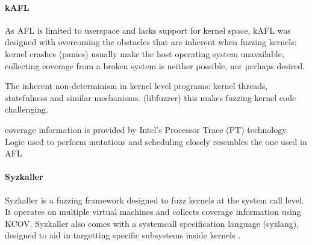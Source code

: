 \paragraph{kAFL}


As AFL is limited to userspace and lacks support for kernel space\cite{kafl}, kAFL was designed with overcoming 
the obstacles that are inherent when fuzzing kernels: kernel crashes (panics) usually make the host operating system
unavailable, collecting coverage from a broken system is neither possible, nor perhaps desired.

The inherent non-determinism in kernel level programs: kernel threads, statefulness and similar mechanisms. (libfuzzer)
this makes fuzzing kernel code challenging.

coverage information is provided by Intel's Processor Trace (PT) technology. Logic used to perform 
mutations and scheduling closely resembles the one used in AFL\cite{kafl}

\paragraph{Syzkaller}

Syzkaller is a fuzzing framework designed to fuzz kernels at the system call level. It operates on multiple 
virtual machines and collects coverage information using KCOV. Syzkaller also comes with a systemcall specification
language (syzlang), designed to aid in targetting specific subsystems inside kernels \cite{syzkaller}.
